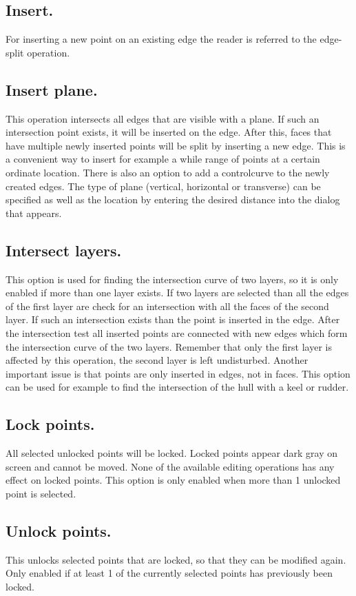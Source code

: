 \documentclass[12pt]{article}
\begin{document}
\subsection{Insert.}
For inserting a new point on an existing edge the reader is referred to the edge-split operation.

\subsection{Insert plane.}
This operation intersects all edges that are visible with a plane. If such an intersection point exists,
it will be inserted on the edge. After this, faces that have multiple newly inserted points will be split
by inserting a new edge. This is a convenient way to insert for example a while range of points at a
certain ordinate location. There is also an option to add a controlcurve to the newly created edges.
The type of plane (vertical, horizontal or transverse) can be specified as well as the location by
entering the desired distance into the dialog that appears.

\subsection{Intersect layers.}
This option is used for finding the intersection curve of two layers, so it is only enabled if more than
one layer exists. If two layers are selected than all the edges of the first layer are check for an
intersection with all the faces of the second layer. If such an intersection exists than the point is
inserted in the edge. After the intersection test all inserted points are connected with new edges
which form the intersection curve of the two layers. Remember that only the first layer is affected by
this operation, the second layer is left undisturbed. Another important issue is that points are only
inserted in edges, not in faces. This option can be used for example to find the intersection of the
hull with a keel or rudder.

\subsection{Lock points.}
All selected unlocked points will be locked. Locked points appear dark gray on screen and cannot
be moved. None of the available editing operations has any effect on locked points. This option is
only enabled when more than 1 unlocked point is selected.

\subsection{Unlock points.}
This unlocks selected points that are locked, so that they can be modified again. Only enabled if at
least 1 of the currently selected points has previously been locked.
\end{document}

